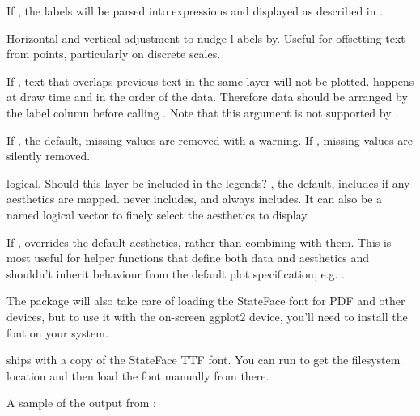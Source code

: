 \documentclass[a4paper]{book}
\begin{document}
\begin{Arguments}
\begin{ldescription}
\item[\code{parse}] If , the labels will be parsed into expressions and
displayed as described in .

\item[\code{nudge\_x}, \code{nudge\_y}] Horizontal and vertical adjustment to nudge l
abels by. Useful for offsetting text from points, particularly
on discrete scales.

\item[\code{check\_overlap}] If , text that overlaps previous text in the
same layer will not be plotted.  happens at draw time and in
the order of the data. Therefore data should be arranged by the label
column before calling . Note that this argument is not
supported by .

\item[\code{na.rm}] If , the default, missing values are removed with
a warning. If , missing values are silently removed.

\item[\code{show.legend}] logical. Should this layer be included in the legends?
, the default, includes if any aesthetics are mapped.
 never includes, and  always includes.
It can also be a named logical vector to finely select the aesthetics to
display.

\item[\code{inherit.aes}] If , overrides the default aesthetics,
rather than combining with them. This is most useful for helper functions
that define both data and aesthetics and shouldn't inherit behaviour from
the default plot specification, e.g. .
\end{ldescription}
\end{Arguments}
%
\begin{Details}
The package will also take care of loading the StateFace font for
PDF and other devices, but to use it with the on-screen ggplot2
device, you'll need to install the font on your system.

 ships with a copy of the StateFace TTF font. You can
run  to get the filesystem location and then
load the font manually from there.




A sample of the output from :


\end{Details}
\end{document}
